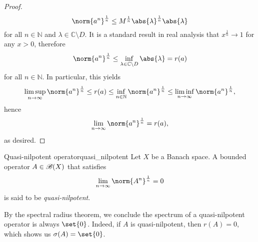 \begin{proof}
    \begin{equation*}
        \norm{a^n}^{\frac1n} \leq M^{\frac1n} \abs{\lambda}^{\frac1n} \abs{\lambda}
    \end{equation*}
    for all \(n \in \mathbb{N}\) and \(\lambda \in \mathbb{C} \setminus D\). It is a standard result in real analysis that \(x^{\frac1n} \to 1\) for any \(x > 0\), therefore
    \begin{equation*}
        \norm{a^n}^{\frac1n} \leq \inf_{\lambda \in \mathbb{C} \setminus D}{\abs{\lambda}} = r(a)
    \end{equation*}
    for all \(n \in \mathbb{N}\). In particular, this yields
    \begin{equation*}
        \limsup_{n\to \infty}{\norm{a^n}^{\frac1n}} \leq r(a) \leq \inf_{n \in \mathbb{N}}{\norm{a^n}^{\frac1n}} \leq \liminf_{n\to\infty}{\norm{a^n}^{\frac1n}},
    \end{equation*}
    hence
    \begin{equation*}
        \lim_{n\to\infty}{\norm{a^n}^{\frac1n}} = r(a),
    \end{equation*}
    as desired.
\end{proof}

\begin{definition}{Quasi-nilpotent operator}{quasi_nilpotent}
    Let \(X\) be a Banach space. A bounded operator \(A \in \mathscr{B}(X)\) that satisfies
    \begin{equation*}
        \lim_{n\to \infty} \norm{A^n}^{\frac1n} = 0
    \end{equation*}
    is said to be \emph{quasi-nilpotent}.
\end{definition}
\begin{remark}
    By the spectral radius theorem, we conclude the spectrum of a quasi-nilpotent operator is always \(\set{0}\). Indeed, if \(A\) is quasi-nilpotent, then \(r(A) = 0\), which shows us \(\sigma(A) = \set{0}\).
\end{remark}

